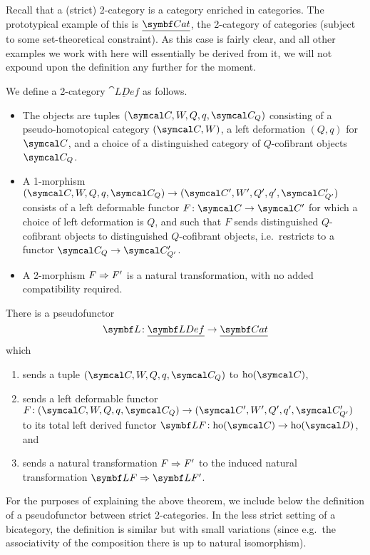 Recall that a (strict) 2-category is a category enriched in categories. The prototypical example of this is \(\underline{\Cat}\), the 2-category of categories (subject to some set-theoretical constraint).
As this case is fairly clear, and all other examples we work with here will essentially be derived from it, we will not expound upon the definition any further for the moment.
\begin{definition}
	We define a 2-category \(\underline{\cat{LDef}}\) as follows.
	\begin{itemize}[label=\(\star\)]
	\item The objects are tuples \((\calC,W,Q,q,\calC_Q)\) consisting of a pseudo-homotopical category \((\calC,W)\), a left deformation \((Q,q)\) for \(\calC\), and
	a choice of a distinguished category of \(Q\)-cofibrant objects \(\calC_Q\).
	\item A 1-morphism \((\calC,W,Q,q,\calC_Q)\to(\calC',W',Q',q',\calC'_{Q'})\) consists of a left deformable functor \(F\!:\calC\to\calC'\) for which a choice
	of left deformation is \(Q\), and such that \(F\) sends distinguished \(Q\)-cofibrant objects to distinguished \(Q\)-cofibrant objects, i.e.\ restricts to a functor \(\calC_Q\to\calC'_{Q'}\).
	\item A 2-morphism \(F\Rightarrow F'\) is a natural transformation, with no added compatibility required.
	\end{itemize}
\end{definition}

\begin{theorem}\label{thm:deformable-functor-derived-functor-pseudofunctoriality}
	There is a pseudofunctor
	\[ \bfL\!: \underline{\cat{LDef}} \to \underline{\Cat} \]
	which
	\begin{enumerate}[label=(\arabic*)]
	\item sends a tuple \((\calC,W,Q,q,\calC_Q)\) to \(\ho(\calC)\),
	\item sends a left deformable functor \(F\!:(\calC,W,Q,q,\calC_Q)\to (\calC',W',Q',q',\calC'_{Q'})\) to its total left derived functor \(\bfL F\!:\ho(\calC)\to\ho(\calD)\), and
	\item sends a natural transformation \(F\Rightarrow F'\) to the induced natural transformation \(\bfL F\To\bfL F'\).
	\end{enumerate}
\end{theorem}

For the purposes of explaining the above theorem, we include below the definition of a pseudofunctor between strict 2-categories. In the less strict setting of a bicategory,
the definition is similar but with small variations (since e.g.\ the associativity of the composition there is up to natural isomorphism).

